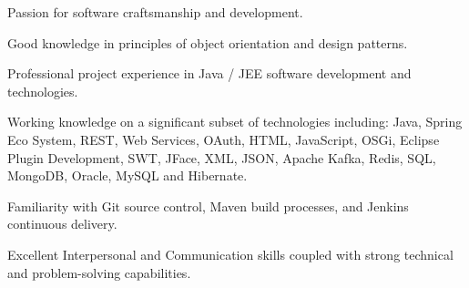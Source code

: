 \begin{cventries}
  \cventryskill
    {
      \begin{cvitems}
        \item {Passion for software craftsmanship and development.}
        \item {Good knowledge in principles of object orientation and design patterns.}
        \item {Professional project experience in Java / JEE software development and technologies.}
        \item {Working knowledge on a significant subset of technologies including: Java, Spring Eco System, REST, Web Services, OAuth, HTML, JavaScript, OSGi, Eclipse Plugin Development, SWT, JFace, XML, JSON, Apache Kafka, Redis, SQL, MongoDB, Oracle, MySQL and Hibernate.}
        \item {Familiarity with Git source control, Maven build processes, and Jenkins continuous delivery.}
        \item {Excellent Interpersonal and Communication skills coupled with strong technical and problem-solving capabilities.}
      \end{cvitems}
    }
\end{cventries}